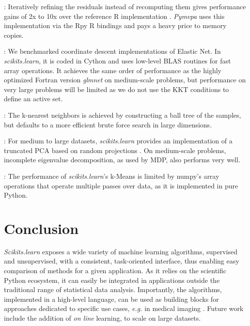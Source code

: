 \documentclass[twoside,11pt]{article}
\begin{document}
\smallskip {}:
%
Iteratively refining the residuals instead of recomputing them gives
performance gains of 2x to 10x over the reference R implementation
\citep{LARS}. {\sl Pymvpa} uses this implementation via the Rpy R
bindings and pays a heavy price to memory copies.


\smallskip {}:
%
We benchmarked coordinate descent implementations of Elastic Net.  In
\emph{scikits.learn}, it is coded in Cython and uses low-level BLAS
routines for fast array operations. It achieves the same order of
performance as the highly optimized Fortran version \emph{glmnet}
\citep{friedman2010} on medium-scale problems, but performance on very
large problems will be limited as we do not use the KKT conditions to
define an active set.

\smallskip
{}:
%
The k-nearest neighbors is achieved by constructing a ball
tree \citep{omohundro1989} of the samples, but defaults to a more
efficient brute force search in large dimensions.

\smallskip {}:
%
For medium to large datasets, \emph{scikits.learn} provides an
implementation of a truncated PCA based on random projections
\citep{rokhlin2009}. On medium-scale problems, incomplete eigenvalue
decomposition, as used by MDP, also performs very well.

\smallskip 
{}:
%
The performance of \emph{scikits.learn}'s k-Means is limited by numpy's
array operations that operate multiple passes over data, as it is
implemented in pure Python.

\section{Conclusion}

\emph{Scikits.learn} exposes a wide variety of machine learning
algorithms, supervised and unsupervised, with a consistent,
task-oriented interface, thus enabling easy comparison of methods for a
given application.
%
As it relies on the scientific Python ecosystem, it can easily be
integrated in applications outside the traditional range of statistical
data analysis. Importantly, the algorithms, implemented in a high-level
language, can be used as building blocks for approaches dedicated to
specific use cases, \emph{e.g.} in medical imaging \citep{Michel2011}.
%
Future work include the addition of \emph{on line} learning, to scale on
large datasets.


\end{document}
